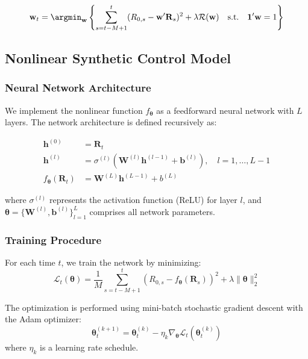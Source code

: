 \begin{equation}
    \mathbf{w}_t = \argmin_{\mathbf{w}} \left\{\sum_{s=t-M+1}^t (R_{0,s} - \mathbf{w}'\mathbf{R}_s)^2 + \lambda\mathcal{R}(\mathbf{w}) \quad \text{s.t.} \quad \mathbf{1}'\mathbf{w} = 1\right\}
\end{equation}

\subsection{Nonlinear Synthetic Control Model}

\subsubsection{Neural Network Architecture}
We implement the nonlinear function $f_{\boldsymbol{\theta}}$ as a feedforward neural network with $L$ layers. The network architecture is defined recursively as:

\begin{equation}
\begin{aligned}
    \mathbf{h}^{(0)} &= \mathbf{R}_t \\
    \mathbf{h}^{(l)} &= \sigma^{(l)}(\mathbf{W}^{(l)}\mathbf{h}^{(l-1)} + \mathbf{b}^{(l)}), \quad l = 1,\ldots,L-1 \\
    f_{\boldsymbol{\theta}}(\mathbf{R}_t) &= \mathbf{W}^{(L)}\mathbf{h}^{(L-1)} + b^{(L)}
\end{aligned}
\end{equation}

where $\sigma^{(l)}$ represents the activation function (ReLU) for layer $l$, and $\boldsymbol{\theta} = \{\mathbf{W}^{(l)}, \mathbf{b}^{(l)}\}_{l=1}^L$ comprises all network parameters.

\subsubsection{Training Procedure}
For each time $t$, we train the network by minimizing:
\begin{equation}
    \mathcal{L}_t(\boldsymbol{\theta}) = \frac{1}{M}\sum_{s=t-M+1}^t (R_{0,s} - f_{\boldsymbol{\theta}}(\mathbf{R}_s))^2 + \lambda\|\boldsymbol{\theta}\|_2^2
\end{equation}

The optimization is performed using mini-batch stochastic gradient descent with the Adam optimizer:
\begin{equation}
    \boldsymbol{\theta}_t^{(k+1)} = \boldsymbol{\theta}_t^{(k)} - \eta_k\nabla_{\boldsymbol{\theta}}\mathcal{L}_t(\boldsymbol{\theta}_t^{(k)})
\end{equation}
where $\eta_k$ is a learning rate schedule.

